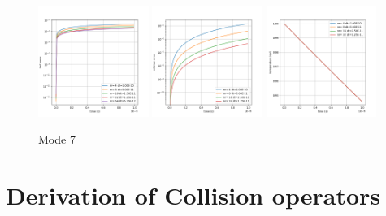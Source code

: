 \documentclass{article}
\begin{document}
\begin{figure}[!htbp]
	\centering
	\includegraphics[width=0.32\textwidth]{fig/dat_1ev_cs_m7_tail.png}
	\includegraphics[width=0.32\textwidth]{fig/dat_1ev_cs_m7_temp_error.png}
	\includegraphics[width=0.32\textwidth]{fig/dat_1ev_cs_m7_temp.png}
	\caption{Mode 7}
\end{figure}






\newpage
\appendix
\section{Derivation of Collision operators}
\end{document}

